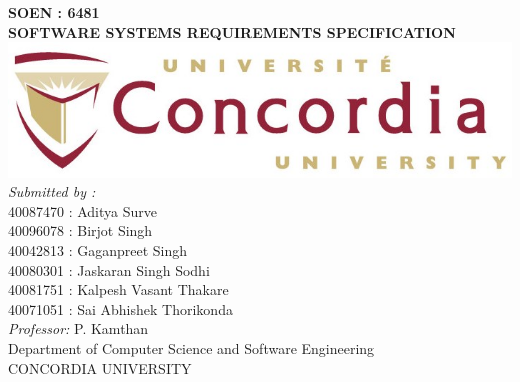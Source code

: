 \documentclass[11pt,oneside]{book}
\begin{document}

\frontmatter

\begin{titlepage}


\begin{center}
{\LARGE \textbf{SOEN : 6481}}\\[1cm]
\linespread{1.2}\huge {\bfseries SOFTWARE SYSTEMS REQUIREMENTS SPECIFICATION}\\[1cm]
\linespread{1}
\includegraphics[scale=0.6]{images/concordia-logo.png}\\
\vspace{3em}
{\large \emph{Submitted by : }}\\
{\Large 40087470 : Aditya Surve}\\
{\Large 40096078 : Birjot Singh}\\
{\Large 40042813 : Gaganpreet Singh}\\
{\Large 40080301 : Jaskaran Singh Sodhi }\\
{\Large 40081751 : Kalpesh Vasant Thakare }\\
{\Large 40071051 : Sai Abhishek Thorikonda}\\[1cm]
{\large \emph{Professor:} P. Kamthan}\\[1cm] %
\large Department of Computer Science and Software Engineering\\[0.3cm] 
CONCORDIA UNIVERSITY\\[1cm]
\end{center}

\end{titlepage}


\end{document}
